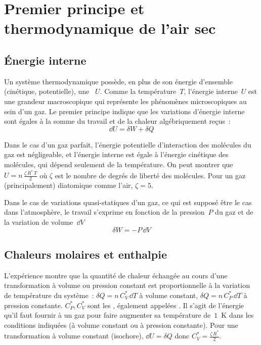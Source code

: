 \mk
\section{Premier principe et thermodynamique de l'air sec} 

\sk
\subsection{\'Energie interne}

\sk
Un système thermodynamique possède, en plus de son énergie d'ensemble (cinétique, potentielle), une ~$U$. Comme la température~$T$, l'énergie interne~$U$ est une grandeur macroscopique qui représente les phénomènes microscopiques au sein d'un gaz. Le premier principe indique que les variations d'énergie interne sont égales à la somme du travail et de
la chaleur algébriquement reçus~:
\[ \dd U = \delta W + \delta Q\]

\sk
Dans le cas d'un gaz parfait, l'énergie potentielle d'interaction des molécules du gaz est négligeable, et l'énergie interne est égale à l'énergie cinétique des molécules, qui dépend seulement de la température. On peut montrer que $U = n \, \frac{\zeta \, R^* \, T}{2}$ où $\zeta$ est le nombre de degrés de liberté des molécules. Pour un gaz (principalement) diatomique comme l'air, $\zeta = 5$. 

\sk
Dans le cas de variations quasi-statiques d'un gaz, ce qui est supposé être le cas dans l'atmosphère, le travail s'exprime en fonction de la pression~$P$ du gaz et de la variation de volume~$\dd V$
\[ \delta W = - P \, \dd V \]

\sk
\subsection{Chaleurs molaires et enthalpie}

\sk
L'expérience montre que la quantité de chaleur échangée au cours d'une transformation à volume ou pression constant est proportionnelle à la variation de température du système~: $\delta Q = n \, C_V^* \, \dd T$ à volume constant, $\delta Q = n \, C_P^* \, \dd T$ à pression constante. $C_P^*, C_V^*$ sont les , également appelées . Il s'agit de l'énergie qu'il faut fournir à un gaz pour faire augmenter sa température de~$1$~K dans les conditions indiquées (à volume constant ou à pression constante). Pour une transformation à volume constant (isochore), $\dd U = \delta Q$ donc $C_V^*=\frac{\zeta \, R^*}{2}$.

